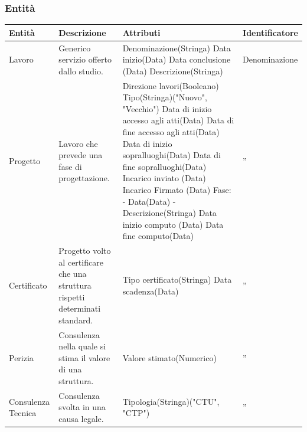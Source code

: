 \documentclass{elegantbook}
\begin{document}
	\subsubsection{Entità}
	\begin{longtable}{|p{2cm}|p{4.6cm}|p{6.2cm}|p{3.2cm}|}
            \hline
            \textbf{Entità} & \textbf{Descrizione} & \textbf{Attributi} & \textbf{Identificatore}\\
            \hline
            Lavoro 
		& Generico servizio offerto dallo studio. 
		& Denominazione(Stringa) 
		\newline Data inizio(Data) 
		\newline Data conclusione (Data) 
		\newline Descrizione(Stringa) 
		& Denominazione \\
            \hline
            Progetto  
		& Lavoro che prevede una fase di progettazione. 
		& Direzione lavori(Booleano) 
		\newline Tipo(Stringa)("Nuovo", "Vecchio") 
		\newline Data di inizio accesso agli atti(Data) 
		\newline Data di fine accesso agli atti(Data) 
		\newline Data di inizio sopralluoghi(Data) 
		\newline Data di fine sopralluoghi(Data) 
		\newline Incarico inviato (Data) 
		\newline Incarico Firmato (Data) 
		\newline Fase: 
		\newline - Data(Data) 
		\newline - Descrizione(Stringa) 
		\newline Data inizio computo (Data) 
		\newline Data fine computo(Data) 
		& '' \\
            \hline
            Certificato 
		& Progetto volto al certificare che una struttura rispetti determinati standard. 
		& Tipo certificato(Stringa) 
		\newline Data scadenza(Data) 
		\newline 
		& ''\\
            \hline
            Perizia 
		& Consulenza nella quale si stima il valore di una struttura. 
		& Valore stimato(Numerico) 
		&  '' \\
            \hline
            Consulenza Tecnica 
		& Consulenza svolta in una causa legale. 
		& Tipologia(Stringa)("CTU", "CTP") 
		&  ''\\

\end{longtable}
\end{document}
